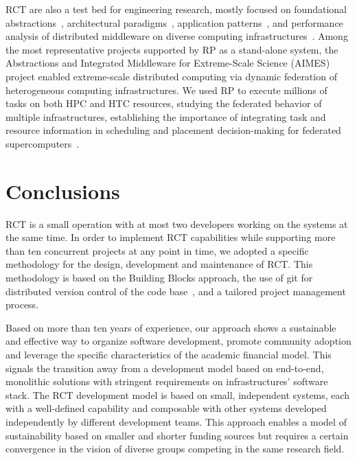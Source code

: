 \documentclass[preprint,12pt, a4paper]{elsarticle}
\begin{document}
RCT are also a test bed for engineering research, mostly focused on foundational
abstractions~\cite{turilli2017evaluating}, architectural
paradigms~\cite{turilli2018comprehensive}, application
patterns~\cite{balasubramanian2016extasy,balasubramanian2018harnessing}, and
performance analysis of distributed middleware on diverse computing
infrastructures~\cite{turilli2017evaluating,dakka2018high}. Among the most
representative projects supported by RP as a stand-alone system, the Abstractions
and Integrated Middleware for Extreme-Scale Science (AIMES) project enabled
extreme-scale distributed computing via dynamic federation of heterogeneous
computing infrastructures. We used RP to execute millions of tasks on both HPC
and HTC resources, studying the federated behavior of multiple infrastructures,
establishing the importance of integrating task and resource information in
scheduling and placement decision-making for federated
supercomputers~\cite{turilli2016integrating}.


\section{Conclusions}\label{sec:conclusions}

RCT is a small operation with at most two developers working on the systems at
the same time. In order to implement RCT capabilities while supporting more than
ten concurrent projects at any point in time, we adopted a specific methodology
for the design, development and maintenance of RCT\@. This methodology is based
on the Building Blocks approach, the use of git for distributed version control
of the code base~\cite{github-rct}, and a tailored project management process.

Based on more than ten years of experience, our approach shows a sustainable and
effective way to organize software development, promote community adoption and
leverage the specific characteristics of the academic financial model. This
signals the transition away from a development model based on end-to-end,
monolithic solutions with stringent requirements on infrastructures' software
stack. The RCT development model is based on small, independent systems, each
with a well-defined capability and composable with other systems developed
independently by different development teams. This approach enables a model of
sustainability based on smaller and shorter funding sources but requires a
certain convergence in the vision of diverse groups competing in the same
research field.
\end{document}
